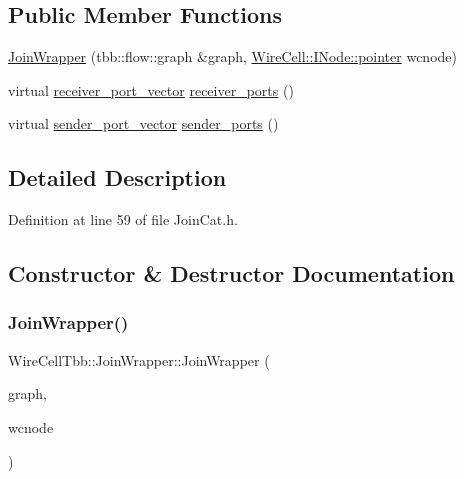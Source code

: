 \subsection*{Public Member Functions}
\begin{DoxyCompactItemize}
\item 
\hyperlink{class_wire_cell_tbb_1_1_join_wrapper_adf83bc1e1949a6e37e2c268f93585fd2}{Join\+Wrapper} (tbb\+::flow\+::graph \&graph, \hyperlink{class_wire_cell_1_1_interface_a09c548fb8266cfa39afb2e74a4615c37}{Wire\+Cell\+::\+I\+Node\+::pointer} wcnode)
\item 
virtual \hyperlink{namespace_wire_cell_tbb_a87f42fe8a3ccc3bf9d315cb2d252c7af}{receiver\+\_\+port\+\_\+vector} \hyperlink{class_wire_cell_tbb_1_1_join_wrapper_ac6d333cda577fcf066561dd48f134440}{receiver\+\_\+ports} ()
\item 
virtual \hyperlink{namespace_wire_cell_tbb_a99272fef0f0c33dc9d4e6e8f777b2e6e}{sender\+\_\+port\+\_\+vector} \hyperlink{class_wire_cell_tbb_1_1_join_wrapper_a5f533ec15abe6bbc05b852af154cb9a1}{sender\+\_\+ports} ()
\end{DoxyCompactItemize}


\subsection{Detailed Description}


Definition at line 59 of file Join\+Cat.\+h.



\subsection{Constructor \& Destructor Documentation}
\mbox{\label{class_wire_cell_tbb_1_1_join_wrapper_adf83bc1e1949a6e37e2c268f93585fd2}} 
\subsubsection{\texorpdfstring{Join\+Wrapper()}{JoinWrapper()}}
{\footnotesize\ttfamily Wire\+Cell\+Tbb\+::\+Join\+Wrapper\+::\+Join\+Wrapper (\begin{DoxyParamCaption}\item[{tbb\+::flow\+::graph \&}]{graph,  }\item[{\hyperlink{class_wire_cell_1_1_interface_a09c548fb8266cfa39afb2e74a4615c37}{Wire\+Cell\+::\+I\+Node\+::pointer}}]{wcnode }\end{DoxyParamCaption})\hspace{0.3cm}{\ttfamily [inline]}}



